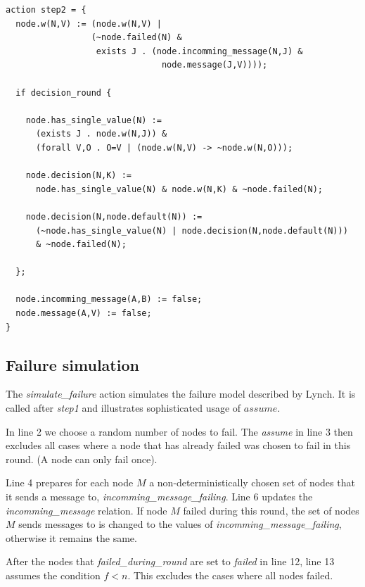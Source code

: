 \documentclass[fleqn]{article}
\begin{document}
\begin{mdframed}[backgroundcolor=light-gray, roundcorner=10pt,leftmargin=1, rightmargin=1, innerleftmargin=15, innertopmargin=15,innerbottommargin=15, outerlinewidth=1, linecolor=light-gray]
\begin{lstlisting}
action step2 = {
  node.w(N,V) := (node.w(N,V) |
                 (~node.failed(N) &
                  exists J . (node.incomming_message(N,J) &
                               node.message(J,V))));

  if decision_round {

    node.has_single_value(N) :=
      (exists J . node.w(N,J)) &
      (forall V,O . O=V | (node.w(N,V) -> ~node.w(N,O)));

    node.decision(N,K) :=
      node.has_single_value(N) & node.w(N,K) & ~node.failed(N);

    node.decision(N,node.default(N)) :=
      (~node.has_single_value(N) | node.decision(N,node.default(N)))
      & ~node.failed(N);

  };

  node.incomming_message(A,B) := false;
  node.message(A,V) := false;
}
\end{lstlisting}
\end{mdframed}

\subsection{Failure simulation}

The \textit{simulate\_failure} action simulates the failure model described by Lynch.
It is called after \textit{step1} and illustrates sophisticated usage of $assume$.

In line 2 we choose a random number of nodes to fail. The \textit{assume} in line 3 then excludes all
cases where a node that has already failed was chosen to fail in this round. (A node can only fail once).

Line 4 prepares for each node $M$ a non-deterministically chosen set of nodes that it sends a message to, \textit{incomming\_message\_failing}.
Line 6 updates the \textit{incomming\_message} relation. If node $M$ failed during this round, the set of nodes
 $M$ sends messages to is changed to the values of \textit{incomming\_message\_failing}, otherwise it remains the same.

 After the nodes that \textit{failed\_during\_round} are set to \textit{failed} in line 12, line 13 assumes
 the condition $f<n$. This excludes the cases where all nodes failed.
\end{document}
